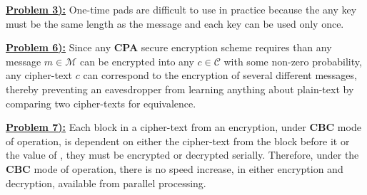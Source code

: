 \documentclass{article}[12]
\numberwithin{equation}{section}
\newcommand{\numbpr}[1]{\setcounter{section}{#1} \setcounter{equation}{0}}
\newcommand{\prob}[1]{\textbf{\underline{Problem #1):}}}
\begin{document}
\begin{flushleft}





\vspace{0.25 in}





\vspace{0.25in}


\numbpr{3}
\prob{3} One-time pads are difficult to use in practice because the any key must be the same length as the message and each key can be used only once. \newline


\vspace{0.25in}





\vspace{0.25in}





\vspace{0.25in}


\numbpr{6} 
\prob{6} Since any \textbf{CPA} secure encryption scheme requires than any message $m \in \mathcal{M}$ can be encrypted into any $c \in \mathcal{C}$ with some non-zero probability, any cipher-text $c$ can correspond to the encryption of several different messages, thereby preventing an eavesdropper from learning anything about plain-text by comparing two cipher-texts for equivalence. \newline


\vspace{0.25in}


\numbpr{7}
\prob{7} Each block in a cipher-text from an encryption, under \textbf{CBC} mode of operation, is dependent on either the cipher-text from the block before it or the value of , they must be encrypted or decrypted serially.  Therefore, under the \textbf{CBC} mode of operation, there is no speed increase, in either encryption and decryption, available from parallel processing. \newline


\vspace{0.25in}





\vspace{0.25in}








\end{flushleft}
\end{document}
